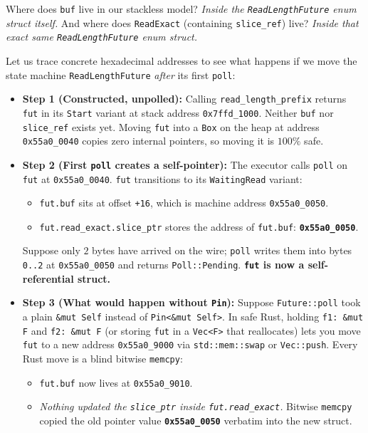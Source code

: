 Where does \texttt{buf} live in our stackless model? \emph{Inside the \texttt{ReadLengthFuture} enum struct itself.} And where does \texttt{ReadExact} (containing \texttt{slice\_ref}) live? \emph{Inside that exact same \texttt{ReadLengthFuture} enum struct.}

Let us trace concrete hexadecimal addresses to see what happens if we move the state machine \texttt{ReadLengthFuture} \emph{after} its first \texttt{poll}:
\begin{itemize}
  \item \textbf{Step 1 (Constructed, unpolled):} Calling \texttt{read\_length\_prefix} returns \texttt{fut} in its \texttt{Start} variant at stack address \texttt{0x7ffd\_1000}. Neither \texttt{buf} nor \texttt{slice\_ref} exists yet. Moving \texttt{fut} into a \texttt{Box} on the heap at address \texttt{0x55a0\_0040} copies zero internal pointers, so moving it is $100\%$ safe.
  \item \textbf{Step 2 (First \texttt{poll} creates a self-pointer):} The executor calls \texttt{poll} on \texttt{fut} at \texttt{0x55a0\_0040}. \texttt{fut} transitions to its \texttt{WaitingRead} variant:
    \begin{itemize}
      \item \texttt{fut.buf} sits at offset \texttt{+16}, which is machine address \texttt{0x55a0\_0050}.
      \item \texttt{fut.read\_exact.slice\_ptr} stores the address of \texttt{fut.buf}: \textbf{\texttt{0x55a0\_0050}}.
    \end{itemize}
    Suppose only $2$ bytes have arrived on the wire; \texttt{poll} writes them into bytes \texttt{0..2} at \texttt{0x55a0\_0050} and returns \texttt{Poll::Pending}. \textbf{\texttt{fut} is now a self-referential struct.}
  \item \textbf{Step 3 (What would happen without \texttt{Pin}):} Suppose \texttt{Future::poll} took a plain \texttt{\&mut Self} instead of \texttt{Pin<\&mut Self>}. In safe Rust, holding \texttt{f1: \&mut F} and \texttt{f2: \&mut F} (or storing \texttt{fut} in a \texttt{Vec<F>} that reallocates) lets you move \texttt{fut} to a new address \texttt{0x55a0\_9000} via \texttt{std::mem::swap} or \texttt{Vec::push}. Every Rust move is a blind bitwise \texttt{memcpy}:
    \begin{itemize}
      \item \texttt{fut.buf} now lives at \texttt{0x55a0\_9010}.
      \item \emph{Nothing updated the \texttt{slice\_ptr} inside \texttt{fut.read\_exact}.} Bitwise \texttt{memcpy} copied the old pointer value \textbf{\texttt{0x55a0\_0050}} verbatim into the new struct.

\end{itemize}
\end{itemize}
